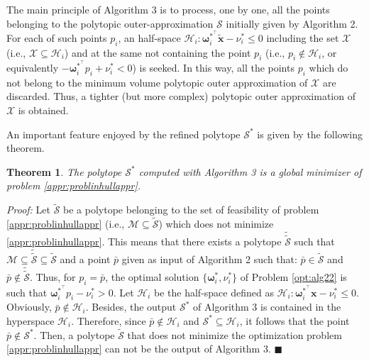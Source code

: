 \documentclass[twocolumn]{autart}
\newtheorem{theorem}{Theorem}
\newenvironment*{proof}{\emph{Proof:}}{}
\newcommand{\DP}[1]{{#1}}
\begin{document}
\DP{The main principle of Algorithm 3 is to process, one by one, all the points belonging to the  polytopic outer-approximation $\mathcal{S}$ initially given by Algorithm 2. For each of such points $p_i$,  an half-space $ \mathcal{H}_i: \boldsymbol{\omega}_i^{*^\top}\tilde{\mathbf{x}}-\nu_i^* \leq 0$ including the set $\mathcal{X}$ (i.e., $\mathcal{X} \subseteq \mathcal{H}_i$) and at the same not containing the point $p_i$ (i.e., $p_i \not\in \mathcal{H}_i$, or equivalently  $-\boldsymbol{\omega}_i^{*^\top}p_i+\nu_i^* < 0$) is seeked. In this way, all the points $p_i$ which do not belong to the minimum volume polytopic outer approximation of $\mathcal{X}$ are discarded. Thus, a tighter (but more complex) polytopic outer approximation of $\mathcal{X}$ is obtained.}

An important feature enjoyed by the refined polytope  $\mathcal{S}^{*}$ is given by the following theorem.\\

\begin{theorem} \label{the:ref}
The polytope $\mathcal{S}^{*}$ computed with  Algorithm 3 is a global minimizer of problem \eqref{appr:problinhullappr}.
\end{theorem}
\begin{proof}
Let  $\tilde{\mathcal{S}}$  be a polytope  belonging to the set of feasibility of problem \eqref{appr:problinhullappr} (i.e., $\mathcal{M} \subseteq \tilde{\mathcal{S}}$) which does not minimize  \eqref{appr:problinhullappr}. This means that there exists a polytope $\tilde{\tilde{\mathcal{S}}}$ such that $\mathcal{M} \subseteq \tilde{\tilde{\mathcal{S}}} \subseteq  \tilde{\mathcal{S}} $ and a point $\bar{p}$ given as input of Algorithm 2 such that:  $\bar{p} \in \tilde{\mathcal{S}}$ and $\bar{p} \not\in \tilde{\tilde{\mathcal{S}}}$. Thus, for $p_i=\bar{p}$, the optimal solution $\{\boldsymbol{\omega}^*_i,\nu^*_i\}$ of Problem \eqref{opt:alg22} is such that $\boldsymbol{\omega}_i^{*^\top}p_i-\nu_i^* > 0$. Let $\mathcal{H}_i$ be the half-space defined as $\mathcal{H}_i: \boldsymbol{\omega}_i^{*^\top} \mathbf{x}-\nu_i^* \leq 0$. Obviously, $\bar{p} \not\in \mathcal{H}_i$. Besides,  the output $\mathcal{S}^{*}$ of Algorithm 3  is contained in the hyperspace $\mathcal{H}_i$. Therefore, since $\bar{p} \not\in \mathcal{H}_i$ and $\mathcal{S}^{*} \subseteq\mathcal{H}_i$, it follows that  the point $\bar{p} \not\in \mathcal{S}^{*}$. Then, a polytope $\tilde{\mathcal{S}}$ that does not minimize the optimization problem \eqref{appr:problinhullappr}  can not be the output of Algorithm 3. \hfill $\blacksquare$
\end{proof}
\end{document}
